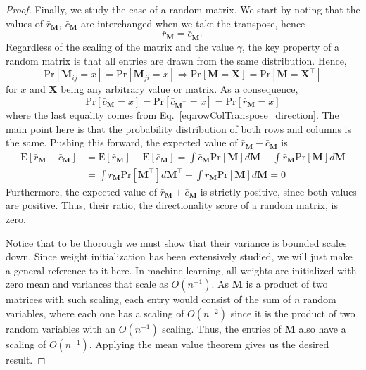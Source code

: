 \begin{proof}
Finally, we study the case of a random matrix. We start by noting that the values of $\bar{r}_{\mathbf{M}},\ \bar{c}_{\mathbf{M}}$ are interchanged when we take the transpose, hence
\begin{equation}\label{eq:rowColTranspose_direction}
    \bar{r}_{\mathbf{M}} =  \bar{c}_{\mathbf{M}^\top}
\end{equation}
Regardless of the scaling of the matrix and the value $\gamma$, the key property of a random matrix is that all entries are drawn from the same distribution. Hence,
 \begin{equation}
     \text{Pr}\left[\bm{M}_{ij} = x\right] = 
     \text{Pr}\left[\bm{M}_{ji} = x\right]
     \Rightarrow
      \text{Pr}\left[\bm{M} = \bm{X}\right] 
      = \text{Pr}\left[\bm{M} = \bm{X}^\top\right] 
 \end{equation}
 for $x$ and $\bm{X}$ being any arbitrary value or matrix. As a consequence,
 \begin{equation}
     \text{Pr}\left[\bar{c}_{\mathbf{M}} = x\right]
     = \text{Pr}\left[\bar{c}_{\mathbf{M}^\top} = x\right] 
     = \text{Pr}\left[\bar{r}_{\mathbf{M}} = x\right]
 \end{equation}
where the last equality comes from Eq.~\ref{eq:rowColTranspose_direction}. The main point here is that the probability distribution of both rows and columns is the same. Pushing this forward, the expected value of $\bar{r}_{\mathbf{M}}- \bar{c}_{\mathbf{M}}$ is
\begin{align}
    \text{E}\left[\bar{r}_{\mathbf{M}}- \bar{c}_{\mathbf{M}}\right]
   & = \text{E}\left[\bar{r}_{\mathbf{M}}\right]-\text{E}\left[\bar{c}_{\mathbf{M}}\right]
    = \int \bar{c}_{\mathbf{M}} \text{Pr}\left[\bm{M}\right] d\bm{M}
    - \int \bar{r}_{\mathbf{M}} \text{Pr}\left[\bm{M}\right] d\bm{M}\\
     &= \int \bar{r}_{\mathbf{M}} \text{Pr}\left[\bm{M}^\top\right] d\bm{M}^\top
    - \int \bar{r}_{\mathbf{M}} \text{Pr}\left[\bm{M}\right] d\bm{M}
    = 0
\end{align}
Furthermore, the expected value of $\bar{r}_{\mathbf{M}}+ \bar{c}_{\mathbf{M}}$ is strictly positive, since both values are positive. Thus, their ratio, the directionality score of a random matrix, is zero. 

Notice that to be thorough we must show that their variance is bounded scales down. Since weight initialization has been extensively studied, we will just make a general reference to it here. In machine learning, all weights are initialized with zero mean and variances that scale as $O(n^{-1})$. As $\bm{M}$ is a product of two matrices with such scaling, each entry would consist of the sum of $n$ random variables, where each one has a scaling of $O(n^{-2})$ since it is the product of two random variables with an $O(n^{-1})$ scaling. Thus, the entries of  $\bm{M}$ also have a scaling of  $O(n^{-1})$. Applying the mean value theorem gives us the desired result.


\end{proof}